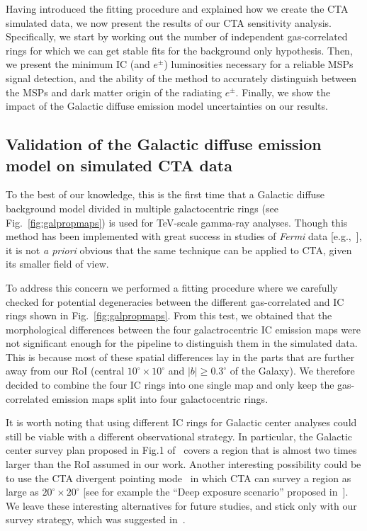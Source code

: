 \documentclass[doublespace,nopageskip]{VTthesis} %
\begin{document}
Having introduced the fitting procedure and explained how we create the CTA simulated data, we now present the results of our CTA sensitivity analysis.
Specifically, we start by working out the number of independent gas-correlated rings for which we can get stable fits for the background only hypothesis. Then, we present the minimum IC (and $e^\pm$) luminosities necessary for a reliable MSPs signal detection, and the ability of the method to accurately distinguish between the MSPs and dark matter origin of the radiating $e^\pm$. Finally, we show the impact of the Galactic diffuse emission model uncertainties on our results.

\subsection{Validation of the Galactic diffuse emission model on simulated CTA data}
\label{subsec:validationGDE}

To the best of our knowledge, this is the first time that a Galactic diffuse background model divided in multiple galactocentric rings (see Fig.~\ref{fig:galpropmaps}) is used for TeV-scale gamma-ray analyses. Though this method has been implemented with great success in studies of \textit{Fermi} data [e.g.,~\citet{Fermi-LAT:4FGL}], it is not {\it a priori} obvious that the same technique can be applied to CTA, given its smaller field of view.

To address this concern
we performed a fitting procedure where we carefully checked for potential degeneracies between the different gas-correlated and IC rings shown in Fig.~\ref{fig:galpropmaps}. From this test, we obtained that the morphological differences between the four galactrocentric IC emission maps were not significant enough for the pipeline to distinguish them in the simulated data. This is because most of these spatial differences lay in the parts that are further away from our RoI (central $10^\circ\times10^\circ$ and $|b|\geq0.3^\circ$ of the Galaxy). We therefore decided to
combine the four IC rings into one single map and only keep the gas-correlated emission
maps split into four galactocentric rings.

It is worth noting that using different IC rings for Galactic center analyses could still be viable with a different observational strategy. In particular, the Galactic center survey plan proposed in Fig.1 of~\citet{Acharyya:2020sbj} covers a region that is almost two times larger than the RoI assumed in our work. Another interesting possibility could be to use the CTA divergent pointing mode~\citep{Gerard:2015gge} in which CTA can survey a region as large as $20^\circ \times 20^\circ$ [see for example the ``Deep exposure scenario'' proposed in~\cite{Coronado-Blazquez:2021avx}]. We leave these interesting alternatives for future studies, and stick only with our survey strategy, which was suggested in~\citet{Rinchiuso:2020skh}. 
\end{document}
